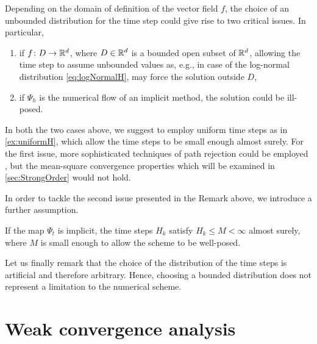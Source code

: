 \documentclass[10pt]{article}
\begin{document}
\begin{remark} Depending on the domain of definition of the vector field $f$, the choice of an unbounded distribution for the time step could give rise to two critical issues. In particular, 
	\begin{enumerate}
		\item if $f\colon D \to \mathbb{R}^d$, where $D \in \mathbb{R}^d$ is a bounded open subset of $\mathbb{R}^d$, allowing the time step to assume unbounded values as, e.g., in case of the log-normal distribution \eqref{eq:logNormalH}, may force the solution outside $D$,
		\item if $\Psi_h$ is the numerical flow of an implicit method, the solution could be ill-posed.
	\end{enumerate}
	In both the two cases above, we suggest to employ uniform time steps as in \cref{ex:uniformH}, which allow the time steps to be small enough almost surely. For the first issue, more sophisticated techniques of path rejection could be employed \cite{MiT05}, but the mean-square convergence properties which will be examined in \cref{sec:StrongOrder} would not hold. 
\end{remark}

In order to tackle the second issue presented in the Remark above, we introduce a further assumption.

\begin{assumption}\label{as:hImplicit} If the map $\Psi_t$ is implicit, the time steps $H_k$ satisfy $H_k \leq M < \infty$ almost surely, where $M$ is small enough to allow the scheme to be well-posed.
\end{assumption}

Let us finally remark that the choice of the distribution of the time steps is artificial and therefore arbitrary. Hence, choosing a bounded distribution does not represent a limitation to the numerical scheme.

\section{Weak convergence analysis}\label{sec:WeakOrder}
\end{document}
